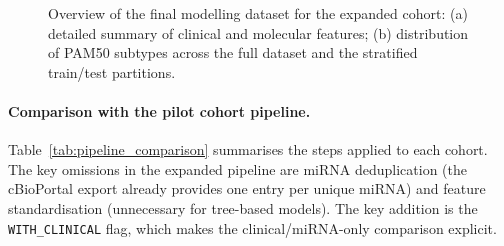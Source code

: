 \begin{figure}[!ht]
\begin{minipage}[c]{0.52\textwidth}
{\begin{tabular}{lr}
        \bottomrule
        \end{tabular}
        }
        \label{tab:dataset_summary_expanded_BG}
    \end{minipage}
    \hfill
    \begin{minipage}[c]{0.45\textwidth}
        \centering
        \label{fig:subtype_histogram_expanded}
    \end{minipage}
 
    \vspace{10pt}
    \caption{Overview of the final modelling dataset for the expanded cohort:
    (a) detailed summary of clinical and molecular features;
    (b) distribution of PAM50 subtypes across the full dataset and the
    stratified train/test partitions.}
    \label{fig:dataset_overview_expanded}
\end{figure}

\paragraph{Comparison with the pilot cohort pipeline.}
Table~\ref{tab:pipeline_comparison} summarises the steps applied to each cohort.
The key omissions in the expanded pipeline are miRNA deduplication (the cBioPortal
export already provides one entry per unique miRNA) and feature standardisation
(unnecessary for tree-based models). The key addition is the \texttt{WITH\_CLINICAL}
flag, which makes the clinical/miRNA-only comparison explicit.

